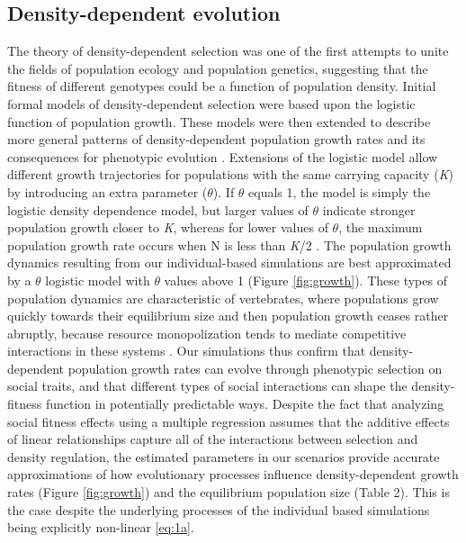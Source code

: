 \documentclass{article}
\begin{document}
\subsection{Density-dependent evolution}
The theory of density-dependent selection was one of the first attempts to unite the fields of population ecology and population genetics, suggesting that the fitness of different genotypes could be a function of population density. Initial formal models of density-dependent selection \citep{Anderson1971, Charlesworth1971} were based upon the logistic function of population growth. These models were then extended to describe more general patterns of density-dependent population growth rates \citep{Gilpin1973a} and its consequences for phenotypic evolution \citep{Gilpin1976}. Extensions of the logistic model allow different growth trajectories for populations with the same carrying capacity (\textit{K}) by introducing an extra parameter ($\theta$). If $\theta$ equals 1, the model is simply the logistic density dependence model, but larger values of $\theta$ indicate stronger population growth closer to \textit{K}, whereas for lower values of $\theta$, the maximum population growth rate occurs when N is less than \textit{K}/2 \citep{Lande2003}. The population growth dynamics resulting from our individual-based simulations are best approximated by a $\theta$ logistic model with $\theta$ values above 1 (Figure \ref{fig:growth}). These types of population dynamics are characteristic of vertebrates, where populations grow quickly towards their equilibrium size and then population growth ceases rather abruptly, because resource monopolization tends to mediate competitive interactions in these systems \citep{Gilpin1973a}. Our simulations thus confirm that density-dependent population growth rates can evolve through phenotypic selection on social traits, and that different types of social interactions can shape the density-fitness function in potentially predictable ways. Despite the fact that analyzing social fitness effects using a multiple regression assumes that the additive effects of linear relationships capture all of the interactions between selection and density regulation, the estimated parameters in our scenarios provide accurate approximations of how evolutionary processes influence density-dependent growth rates (Figure \ref{fig:growth}) and the equilibrium population size (Table 2). This is the case despite the underlying processes of the individual based simulations being explicitly non-linear \ref{eq:1a}. 
\end{document}
